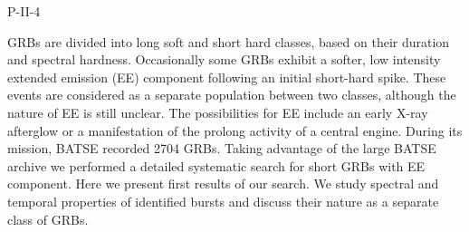 P-II-4


\bigskip



\bigskip

\noindent GRBs are divided into long soft and short hard classes, based on their duration and spectral hardness. Occasionally some GRBs exhibit a softer, low intensity extended emission (EE) component following an initial short-hard spike. These events are considered as a separate population between two classes, although the nature of EE is still unclear. The possibilities for EE include an early X-ray afterglow or a manifestation of the prolong activity of a central engine. During its mission, BATSE recorded 2704 GRBs. Taking advantage of the large BATSE archive we performed a detailed systematic search for short GRBs with EE component. Here we present first results of our search. We study spectral and temporal properties of identified bursts and discuss their nature as a separate class of GRBs.

